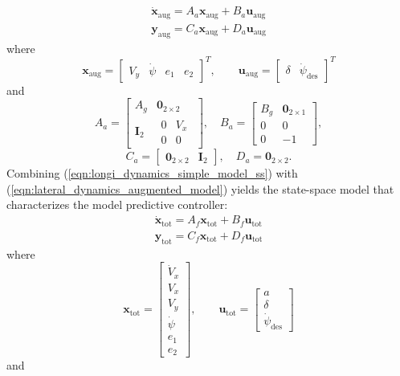 \documentclass[conference, 11pt]{IEEEtran}
\begin{document}
\begin{equation}
\label{eqn:lateral_dynamics_augmented_model}
\begin{array}{ll}
\dot{\textbf{x}}_{\text{aug}} =A_a \textbf{x}_{\text{aug}}+ B_a \textbf{u}_{\text{aug}}\\
\textbf{y}_{\text{aug}} =C_a \textbf{x}_{\text{aug}} + D_a \textbf{u}_{\text{aug}}
\end{array}
\end{equation}
where
\begin{equation*}
\textbf{x}_{\text{aug}} = \begin{bmatrix}
V_y&\dot{\psi}&e_1&e_2
\end{bmatrix}^T,
\qquad
\textbf{u}_{\text{aug}} = 
\begin{bmatrix}
\delta&\dot{\psi}_{\text{des}}
\end{bmatrix}^T
\end{equation*}
and
\[ 
A_a=\begin{bmatrix}
A_g&\textbf{0}_{2\times2}\\
\textbf{I}_2&\begin{matrix}
0&V_x\\
0&0
\end{matrix}
\end{bmatrix},
\quad
B_a=\begin{bmatrix}
B_g&\textbf{0}_{2\times1}\\
0&0\\
0&-1
\end{bmatrix},
\]
\[
C_a=\begin{bmatrix}
\textbf{0}_{2\times2}&\textbf{I}_2
\end{bmatrix}, 
\quad
D_a=
\textbf{0}_{2\times2}. 
\]
Combining (\ref{eqn:longi_dynamics_simple_model_ss}) with (\ref{eqn:lateral_dynamics_augmented_model}) yields the state-space model that characterizes the model predictive controller:
\begin{equation}
\label{eqn:full_dynamics_model}
\begin{array}{ll}
\dot{\textbf{x}}_{\text{tot}} =A_f \textbf{x}_{\text{tot}}+ B_f \textbf{u}_{\text{tot}}\\
\textbf{y}_{\text{tot}} =C_f \textbf{x}_{\text{tot}} + D_f \textbf{u}_{\text{tot}}
\end{array}
\end{equation}
where
\begin{equation*}
\textbf{x}_{\text{tot}} = \begin{bmatrix}
\dot{V}_x\\V_x\\V_y\\\dot{\psi}\\e_1\\e_2
\end{bmatrix},
\qquad
\textbf{u}_{\text{tot}} = 
\begin{bmatrix}
a\\\delta\\\dot{\psi}_{\text{des}}
\end{bmatrix}
\end{equation*}
and
\end{document}
